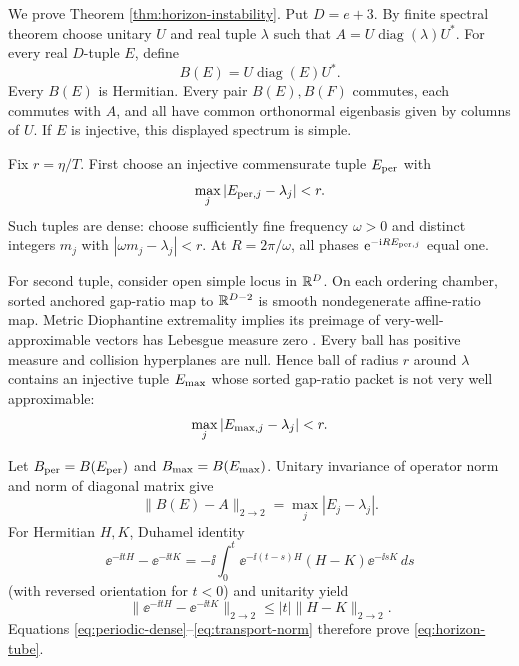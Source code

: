 We prove Theorem \ref{thm:horizon-instability}.  Put $D=e+3$.  By finite
spectral theorem choose unitary $U$ and real tuple $\lambda$ such that
$A=U\operatorname{diag}(\lambda)U^*$.  For every real $D$-tuple $E$, define
\begin{equation}
 B(E)=U\operatorname{diag}(E)U^*.                     \label{eq:spectral-transport}
\end{equation}
Every $B(E)$ is Hermitian.  Every pair $B(E),B(F)$ commutes, each commutes
with $A$, and all have common orthonormal eigenbasis given by columns of $U$.
If $E$ is injective, this displayed spectrum is simple.

Fix $r=\eta/T$.  First choose an injective commensurate tuple
$E_{\rm per}$ with
\begin{equation}
 \max_j|E_{{\rm per},j}-\lambda_j|<r.                \label{eq:periodic-dense}
\end{equation}
Such tuples are dense: choose sufficiently fine frequency $\omega>0$ and
distinct integers $m_j$ with $|\omega m_j-\lambda_j|<r$.  At
$R=2\pi/\omega$, all phases $\mathrm e^{-\mathrm i R E_{{\rm per},j}}$ equal one.

For second tuple, consider open simple locus in $\mathbb R^D$.  On each ordering
chamber, sorted anchored gap-ratio map to $\mathbb R^{D-2}$ is smooth
nondegenerate affine-ratio map.  Metric Diophantine extremality implies its
preimage of very-well-approximable vectors has Lebesgue measure zero
\cite{KleinbockMargulis1998}.  Every ball has positive measure and collision
hyperplanes are null.  Hence ball of radius $r$ around $\lambda$ contains an
injective tuple $E_{\rm max}$ whose sorted gap-ratio packet is not very well
approximable:
\begin{equation}
 \max_j|E_{{\rm max},j}-\lambda_j|<r.                \label{eq:maximal-dense}
\end{equation}

Let $B_{\rm per}=B(E_{\rm per})$ and
$B_{\rm max}=B(E_{\rm max})$.  Unitary invariance of operator norm and norm
of diagonal matrix give
\begin{equation}
 \|B(E)-A\|_{2\to2}=\max_j|E_j-\lambda_j|.           \label{eq:transport-norm}
\end{equation}
For Hermitian $H,K$, Duhamel identity
\begin{equation}
 \ee^{-\ii tH}-\ee^{-\ii tK}
 =-\ii\int_0^t \ee^{-\ii(t-s)H}(H-K)\ee^{-\ii sK}\,ds
\end{equation}
(with reversed orientation for $t<0$) and unitarity yield
\begin{equation}
 \|\ee^{-\ii tH}-\ee^{-\ii tK}\|_{2\to2}
 \le |t|\|H-K\|_{2\to2}.                            \label{eq:duhamel-horizon}
\end{equation}
Equations \eqref{eq:periodic-dense}--\eqref{eq:transport-norm} therefore
prove \eqref{eq:horizon-tube}.

